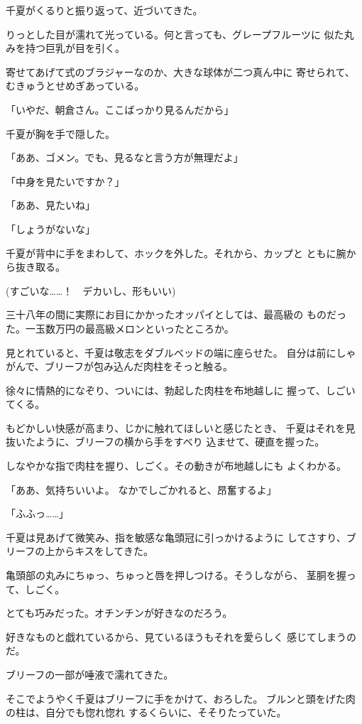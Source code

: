 ﻿\documentclass[
    book,tate,
    line_length=30zw,
    jafontsize=12pt,
    paper=b5j,
    landscape,
    ]{jlreq}
\begin{document}
千夏がくるりと振り返って、近づいてきた。

りっとした目が濡れて光っている。何と言っても、グレープフルーツに
似た丸みを持つ巨乳が目を引く。

寄せてあげて式のブラジャーなのか、大きな球体が二つ真ん中に
寄せられて、むきゅうとせめぎあっている。

「いやだ、朝倉さん。ここばっかり見るんだから」

千夏が胸を手で隠した。

「ああ、ゴメン。でも、見るなと言う方が無理だよ」

「中身を見たいですか？」

「ああ、見たいね」

「しょうがないな」

千夏が背中に手をまわして、ホックを外した。それから、カップと
ともに腕から抜き取る。

(すごいな……！　デカいし、形もいい)

三十八年の間に実際にお目にかかったオッパイとしては、最高級の
ものだった。一玉数万円の最高級メロンといったところか。

見とれていると、千夏は敬志をダブルベッドの端に座らせた。
自分は前にしゃがんで、ブリーフが包み込んだ肉柱をそっと触る。

徐々に情熱的になぞり、ついには、勃起した肉柱を布地越しに
握って、しごいてくる。

もどかしい快感が高まり、じかに触れてほしいと感じたとき、
千夏はそれを見抜いたように、ブリーフの横から手をすべり
込ませて、硬直を握った。

しなやかな指で肉柱を握り、しごく。その動きが布地越しにも
よくわかる。

「ああ、気持ちいいよ。 なかでしごかれると、昂奮するよ」

「ふふっ……」

千夏は見あげて微笑み、指を敏感な亀頭冠に引っかけるように
してさすり、ブリーフの上からキスをしてきた。

亀頭部の丸みにちゅっ、ちゅっと唇を押しつける。そうしながら、
茎胴を握って、しごく。

とても巧みだった。オチンチンが好きなのだろう。

好きなものと戯れているから、見ているほうもそれを愛らしく
感じてしまうのだ。

ブリーフの一部が唾液で濡れてきた。

そこでようやく千夏はブリーフに手をかけて、おろした。
ブルンと頭をげた肉の柱は、自分でも惚れ惚れ
するくらいに、そそりたっていた。
\end{document}
